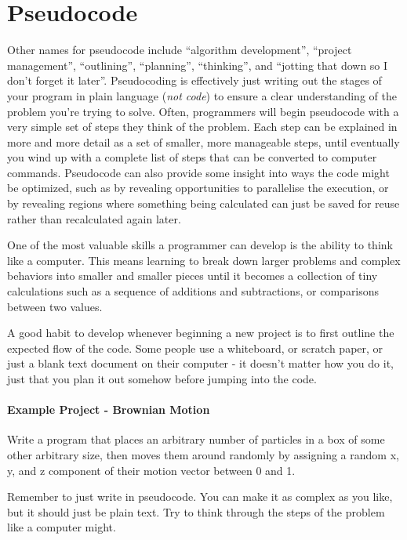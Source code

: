 \section{Pseudocode}
Other names for pseudocode include ``algorithm development'', ``project management'', ``outlining'', ``planning'', ``thinking'', and ``jotting that down so I don't forget it later''.
Pseudocoding is effectively just writing out the stages of your program in plain language (\emph{not code}) to ensure a clear understanding of the problem you're trying to solve. 
Often, programmers will begin pseudocode with a very simple set of steps they think of the problem. 
Each step can be explained in more and more detail as a set of smaller, more manageable steps, until eventually you wind up with a complete list of steps that can be converted to computer commands. 
Pseudocode can also provide some insight into ways the code might be optimized, such as by revealing opportunities to parallelise the execution, or by revealing regions where something being calculated can just be saved for reuse rather than recalculated again later.

One of the most valuable skills a programmer can develop is the ability to think like a computer.
This means learning to break down larger problems and complex behaviors into smaller and smaller pieces until it becomes a collection of tiny calculations such as a sequence of additions and subtractions, or comparisons between two values.

A good habit to develop whenever beginning a new project is to first outline the expected flow of the code. 
Some people use a whiteboard, or scratch paper, or just a blank text document on their computer - it doesn't matter how you do it, just that you plan it out somehow before jumping into the code.

\hypertarget{example-project---brownian-motion}{%
\paragraph{Example Project - Brownian
Motion}\label{example-project---brownian-motion}}

Write a program that places an arbitrary number of particles in a box of
some other arbitrary size, then moves them around randomly by assigning
a random x, y, and z component of their motion vector between 0 and 1.

Remember to just write in pseudocode. 
You can make it as complex as you like, but
it should just be plain text. Try to think through the steps of the
problem like a computer might.

